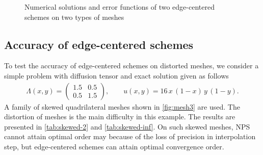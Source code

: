 \documentclass[times,review,preprint]{elsarticle}
\begin{document}
\begin{figure}[h]
\caption{Numerical solutions and error functions of two edge-centered schemes on two types of meshes}
\label{fig:solution}
\end{figure}

\subsection{Accuracy of edge-centered schemes}

To test the accuracy of edge-centered schemes on distorted meshes, we consider a simple problem with diffusion tensor and exact solution given as follows
\begin{align*}
\Lambda(x,y) =
\left(
\begin{matrix}
1.5 & 0.5 \\
0.5 & 1.5
\end{matrix}
\right),
\qquad
u(x,y) = 16 \, x \, (1-x) \, y \, (1-y).
\end{align*}
A family of skewed quadrilateral meshes shown in \cref{fig:mesh3} are used. The distortion of meshes is the main difficulty in this example. The results are presented in \cref{tab:skewed-2} and \cref{tab:skewed-inf}.
On such skewed meshes, NPS cannot attain optimal order may because of the loss of precision in interpolation step, but edge-centered schemes can attain optimal convergence order.
\end{document}
